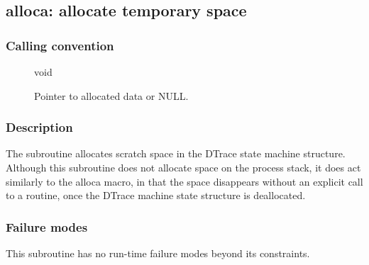 \clearpage
{}
{}
\label{subr:alloca}
\subsection*{alloca: allocate temporary space}

\subsubsection*{Calling convention}

\begin{description}
\item[] void
\item[] Pointer to allocated data or NULL.
\end{description}

\subsubsection*{Description}

The  subroutine allocates scratch space in the
DTrace state machine structure.  Although this subroutine does not
allocate space on the process stack, it does act similarly to the
alloca macro, in that the space disappears without an explicit call to
a  routine, once the DTrace machine state structure
is deallocated.

\subsubsection*{Failure modes}

This subroutine has no run-time failure modes beyond its constraints.
